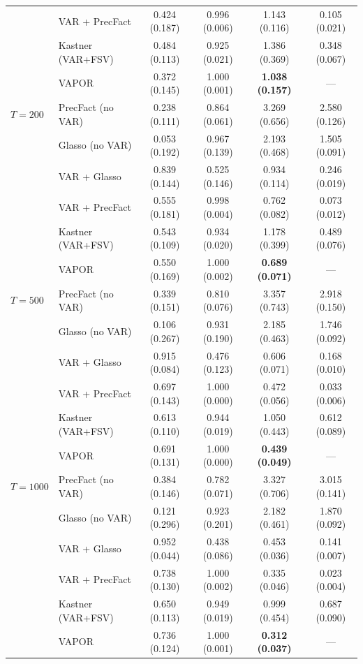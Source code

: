 \begin{table}[h!]
\begin{tabular}{llcccc}
           & VAR + PrecFact     & 0.424 (0.187) & 0.996 (0.006) & 1.143 (0.116) & 0.105 (0.021) \\
           & Kastner (VAR+FSV)  & 0.484 (0.113) & 0.925 (0.021) & 1.386 (0.369) & 0.348 (0.067) \\
           & VAPOR              & 0.372 (0.145) & 1.000 (0.001) & \textbf{1.038 (0.157)} & --- \\
\midrule
$T = 200$  & PrecFact (no VAR)  & 0.238 (0.111) & 0.864 (0.061) & 3.269 (0.656) & 2.580 (0.126) \\
           & Glasso (no VAR)    & 0.053 (0.192) & 0.967 (0.139) & 2.193 (0.468) & 1.505 (0.091) \\
           & VAR + Glasso       & 0.839 (0.144) & 0.525 (0.146) & 0.934 (0.114) & 0.246 (0.019) \\
           & VAR + PrecFact     & 0.555 (0.181) & 0.998 (0.004) & 0.762 (0.082) & 0.073 (0.012) \\
           & Kastner (VAR+FSV)  & 0.543 (0.109) & 0.934 (0.020) & 1.178 (0.399) & 0.489 (0.076) \\
           & VAPOR              & 0.550 (0.169) & 1.000 (0.002) & \textbf{0.689 (0.071)} & --- \\
\midrule
$T = 500$  & PrecFact (no VAR)  & 0.339 (0.151) & 0.810 (0.076) & 3.357 (0.743) & 2.918 (0.150) \\
           & Glasso (no VAR)    & 0.106 (0.267) & 0.931 (0.190) & 2.185 (0.463) & 1.746 (0.092) \\
           & VAR + Glasso       & 0.915 (0.084) & 0.476 (0.123) & 0.606 (0.071) & 0.168 (0.010) \\
           & VAR + PrecFact     & 0.697 (0.143) & 1.000 (0.000) & 0.472 (0.056) & 0.033 (0.006) \\
           & Kastner (VAR+FSV)  & 0.613 (0.110) & 0.944 (0.019) & 1.050 (0.443) & 0.612 (0.089) \\
           & VAPOR              & 0.691 (0.131) & 1.000 (0.000) & \textbf{0.439 (0.049)} & --- \\
\midrule
$T = 1000$ & PrecFact (no VAR)  & 0.384 (0.146) & 0.782 (0.071) & 3.327 (0.706) & 3.015 (0.141) \\
           & Glasso (no VAR)    & 0.121 (0.296) & 0.923 (0.201) & 2.182 (0.461) & 1.870 (0.092) \\
           & VAR + Glasso       & 0.952 (0.044) & 0.438 (0.086) & 0.453 (0.036) & 0.141 (0.007) \\
           & VAR + PrecFact     & 0.738 (0.130) & 1.000 (0.002) & 0.335 (0.046) & 0.023 (0.004) \\
           & Kastner (VAR+FSV)  & 0.650 (0.113) & 0.949 (0.019) & 0.999 (0.454) & 0.687 (0.090) \\
           & VAPOR              & 0.736 (0.124) & 1.000 (0.001) & \textbf{0.312 (0.037)} & --- \\
\bottomrule
\end{tabular}
\end{table}

